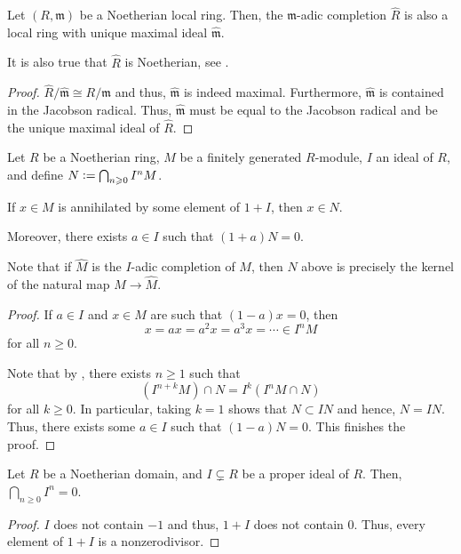 \begin{cor} \label{cor:completion-noetherian-local-is-local}
	Let $(R, \mathfrak{m})$ be a Noetherian local ring. Then, the $\mathfrak{m}$-adic completion $\widehat{R}$ is also a local ring with unique maximal ideal $\widehat{\mathfrak{m}}$.
\end{cor}
It is also true that $\widehat{R}$ is Noetherian, see .
\begin{proof} 
	$\widehat{R}/\widehat{\mathfrak{m}} \cong R/\mathfrak{m}$ and thus, $\widehat{\mathfrak{m}}$ is indeed maximal. Furthermore, $\widehat{\mathfrak{m}}$ is contained in the Jacobson radical. Thus, $\widehat{\mathfrak{m}}$ must be equal to the Jacobson radical and be the unique maximal ideal of $\widehat{R}$.
\end{proof}

\begin{thm} \label{thm:KIT}
	Let $R$ be a Noetherian ring, $M$ be a finitely generated $R$-module, $I$ an ideal of $R$, and define $N \vcentcolon= \bigcap_{n \ge 0} I^{n} M$. 

	If $x \in M$ is annihilated by some element of $1 + I$, then $x \in N$.

	Moreover, there exists $a \in I$ such that $(1 + a) N = 0$.
\end{thm}
\begin{rem}
	Note that if $\widehat{M}$ is the $I$-adic completion of $M$, then $N$ above is precisely the kernel of the natural map $M \to \widehat{M}$.
\end{rem}
\begin{proof} 
	If $a \in I$ and $x \in M$ are such that $(1 - a) x = 0$, then
	\begin{equation*} 
		x = a x = a^{2} x = a^{3} x = \cdots \in I^{n} M
	\end{equation*}
	for all $n \ge 0$.

	Note that by , there exists $n \ge 1$ such that
	\begin{equation*} 
		(I^{n + k} M) \cap N = I^{k} (I^{n} M \cap N)
	\end{equation*}
	for all $k \ge 0$. In particular, taking $k = 1$ shows that $N \subset IN$ and hence, $N = IN$. Thus, there exists some $a \in I$ such that $(1 - a)N = 0$. This finishes the proof.
\end{proof}

\begin{cor} \label{cor:krull-noetherian-domain}
	Let $R$ be a Noetherian domain, and $I \subsetneq R$ be a proper ideal of $R$. Then, $\bigcap_{n \ge 0} I^{n} = 0$.
\end{cor}
\begin{proof} 
	$I$ does not contain $-1$ and thus, $1 + I$ does not contain $0$. Thus, every element of $1 + I$ is a nonzerodivisor.
\end{proof}

